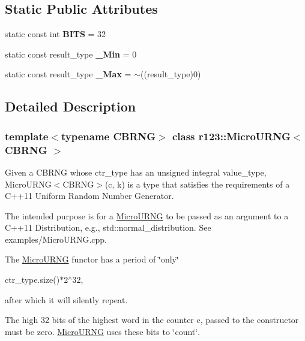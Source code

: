 \subsection*{Static Public Attributes}
\begin{DoxyCompactItemize}
\item 
\hypertarget{classr123_1_1MicroURNG_ac55cddda8fe0808f922f39beee587b27}{}\label{classr123_1_1MicroURNG_ac55cddda8fe0808f922f39beee587b27} 
static const int {\bfseries B\+I\+TS} = 32
\item 
\hypertarget{classr123_1_1MicroURNG_a1f2787f136a8a807d14eab8cb1ca8c14}{}\label{classr123_1_1MicroURNG_a1f2787f136a8a807d14eab8cb1ca8c14} 
static const result\+\_\+type {\bfseries \+\_\+\+Min} = 0
\item 
\hypertarget{classr123_1_1MicroURNG_a4faecd7ab54c7678ee66c413bb984bf0}{}\label{classr123_1_1MicroURNG_a4faecd7ab54c7678ee66c413bb984bf0} 
static const result\+\_\+type {\bfseries \+\_\+\+Max} = $\sim$((result\+\_\+type)0)
\end{DoxyCompactItemize}


\subsection{Detailed Description}
\subsubsection*{template$<$typename C\+B\+R\+NG$>$\newline
class r123\+::\+Micro\+U\+R\+N\+G$<$ C\+B\+R\+N\+G $>$}

Given a C\+B\+R\+NG whose ctr\+\_\+type has an unsigned integral value\+\_\+type, Micro\+U\+R\+N\+G$<$\+C\+B\+R\+N\+G$>$(c, k) is a type that satisfies the requirements of a C++11 Uniform Random Number Generator. 

The intended purpose is for a \hyperlink{classr123_1_1MicroURNG}{Micro\+U\+R\+NG} to be passed as an argument to a C++11 Distribution, e.\+g., std\+::normal\+\_\+distribution. See examples/\+Micro\+U\+R\+N\+G.\+cpp.

The \hyperlink{classr123_1_1MicroURNG}{Micro\+U\+R\+NG} functor has a period of \char`\"{}only\char`\"{}

ctr\+\_\+type.\+size()$\ast$2$^\wedge$32,

after which it will silently repeat.

The high 32 bits of the highest word in the counter c, passed to the constructor must be zero. \hyperlink{classr123_1_1MicroURNG}{Micro\+U\+R\+NG} uses these bits to \char`\"{}count\char`\"{}.

